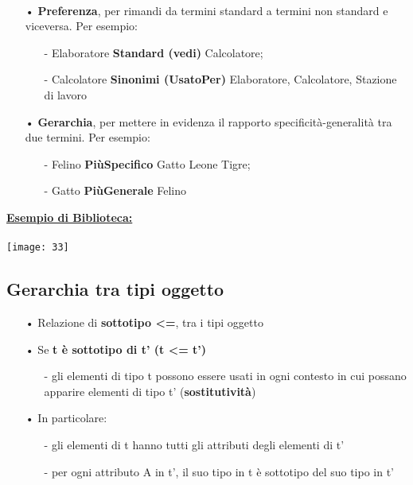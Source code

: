 \documentclass[12pt, letterpaper]{article}
\begin{document}
\\
\begin{itemize}
   \item[•] \textbf{Preferenza}, per rimandi da termini standard a termini non standard e viceversa.
            Per esempio:
      \begin{itemize}
         \item[-] Elaboratore \textbf{Standard (vedi)} Calcolatore;
         \item[-] Calcolatore \textbf{Sinonimi (UsatoPer)} Elaboratore, Calcolatore, Stazione di lavoro 
      \end{itemize}
   \item[•] \textbf{Gerarchia}, per mettere in evidenza il rapporto specificità-generalità tra due
            termini. Per esempio:
      \begin{itemize}
         \item[-] Felino \textbf{PiùSpecifico} Gatto Leone Tigre;
         \item[-] Gatto \textbf{PiùGenerale} Felino
      \end{itemize}
\end{itemize}

\underline{\textbf{Esempio di Biblioteca:}}
\\
\\
\texttt{[image: 33]}

\subsection{Gerarchia tra tipi oggetto}

\begin{itemize}
   \item[•] Relazione di \textbf{sottotipo <=}, tra i tipi oggetto 
   \item[•] Se \textbf{t è sottotipo di t' (t <= t')}
      \begin{itemize}
         \item[-] gli elementi di tipo t possono essere usati in ogni contesto 
            in cui possano apparire elementi di tipo t' (\textbf{sostitutività})
      \end{itemize}
   \item[•] In particolare:
      \begin{itemize}
         \item[-] gli elementi di t hanno tutti gli attributi degli elementi di t' 
         \item[-] per ogni attributo A in t', il suo tipo in t è sottotipo del suo tipo in t'
      \end{itemize}
\end{itemize}
\end{document}
